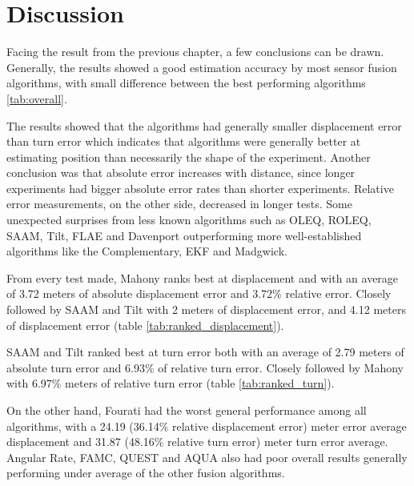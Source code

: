 \section{Discussion}
Facing the result from the previous chapter, a few conclusions can be drawn. Generally, the results showed a good estimation accuracy by most sensor fusion algorithms, with small difference between the best performing algorithms \ref{tab:overall}.



The results showed that the algorithms had generally smaller displacement error than turn error which indicates that algorithms were generally better at estimating position than necessarily the shape of the experiment. Another conclusion was that absolute error increases with distance, since longer experiments had bigger absolute error rates than shorter experiments. Relative error measurements, on the other side, decreased in longer tests. Some unexpected surprises from less known algorithms such as OLEQ, ROLEQ, SAAM, Tilt, FLAE and Davenport outperforming more well-established algorithms like the Complementary, EKF and Madgwick.

From every test made, Mahony ranks best at displacement and with an average of 3.72 meters of absolute displacement error and 3.72\% relative error. Closely followed by SAAM and Tilt with 2 meters of displacement error, and 4.12 meters of displacement error (table \ref{tab:ranked_displacement}).



SAAM and Tilt ranked best at turn error both with an average of 2.79 meters of absolute turn error and 6.93\% of relative turn error. Closely followed by Mahony with 6.97\% meters of relative turn error (table \ref{tab:ranked_turn}).



On the other hand, Fourati had the worst general performance among all algorithms, with a 24.19 (36.14\% relative displacement error) meter error average displacement and 31.87 (48.16\% relative turn error) meter turn error average. Angular Rate, FAMC, QUEST and AQUA also had poor overall results generally performing under average of the other fusion algorithms.

